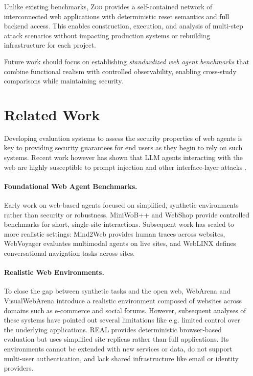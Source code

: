 \documentclass{article} %
\newcommand{\zoo}{\textsc{Zoo}}
\begin{document}
Unlike existing benchmarks, \zoo{} provides a self-contained network of interconnected web applications with deterministic reset semantics and full backend access.
This enables construction, execution, and analysis of multi-step attack scenarios without impacting production systems or rebuilding infrastructure for each project.

Future work should focus on establishing \textit{standardized web agent benchmarks} that combine functional realism with controlled observability, enabling cross-study comparisons while maintaining security.

\section{Related Work}
\label{sec:relatedwork}

Developing evaluation systems to assess the security properties of web agents is key to providing security guarantees for end users as they begin to rely on such systems.
Recent work however has shown that LLM agents interacting with the web are highly susceptible to prompt injection and other interface-layer attacks \citep{wasp, perplexity_coment, phishing_for_gemini, witt2025open}.

\paragraph{Foundational Web Agent Benchmarks.}
Early work on web-based agents focused on simplified, synthetic environments rather than security or robustness.
MiniWoB++ \citep{miniwob} and WebShop \citep{webshop} provide controlled benchmarks for short, single-site interactions.
Subsequent work has scaled to more realistic settings: Mind2Web \citep{mind2web} provides human traces across websites, WebVoyager \citep{webvoyager} evaluates multimodal agents on live sites, and WebLINX \citep{weblinx} defines conversational navigation tasks across sites.

\paragraph{Realistic Web Environments.}
To close the gap between synthetic tasks and the open web, WebArena and VisualWebArena \citep{webarena, visualwebarena} introduce a realistic environment composed of websites across domains such as e-commerce and social forums.
However, subsequent analyses of these systems have pointed out several limitations \citep{ai_agents_that_matter} like e.g. limited control over the underlying applications.
REAL \citep{real} provides deterministic browser-based evaluation but uses simplified site replicas rather than full applications.
Its environments cannot be extended with new services or data, do not support multi-user authentication, and lack shared infrastructure like email or identity providers.
\end{document}
